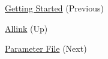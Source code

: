 
\begin{DoxyItemize}
\item \hyperlink{usage_page}{\-Getting \-Started} (\-Previous)  
\item \hyperlink{index}{\-Allink} (\-Up)  
\item \hyperlink{param_page}{\-Parameter \-File} (\-Next)  
\end{DoxyItemize}